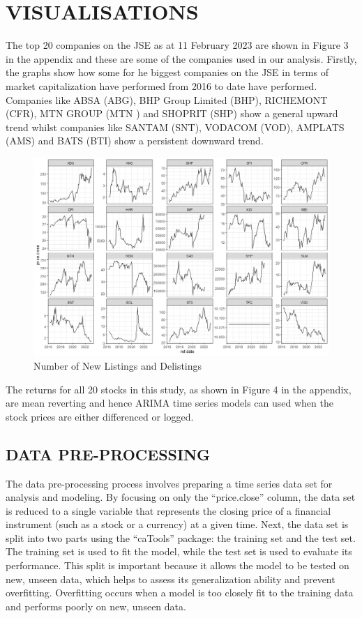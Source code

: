 \documentclass[
]{article}
\begin{document}
\hypertarget{visualisations}{%
\section{VISUALISATIONS}\label{visualisations}}

The top 20 companies on the JSE as at 11 February 2023 are shown in
Figure 3 in the appendix and these are some of the companies used in our
analysis. Firstly, the graphs show how some for he biggest companies on
the JSE in terms of market capitalization have performed from 2016 to
date have performed. Companies like ABSA (ABG), BHP Group Limited (BHP),
RICHEMONT (CFR), MTN GROUP (MTN ) and SHOPRIT (SHP) show a general
upward trend whilst companies like SANTAM (SNT), VODACOM (VOD), AMPLATS
(AMS) and BATS (BTI) show a persistent downward trend.

\begin{figure}
\centering
\includegraphics{prices.png}
\caption{Number of New Listings and Delistings}
\end{figure}

The returns for all 20 stocks in this study, as shown in Figure 4 in the
appendix, are mean reverting and hence ARIMA time series models can used
when the stock prices are either differenced or logged.

\hypertarget{data-pre-processing}{%
\subsection{DATA PRE-PROCESSING}\label{data-pre-processing}}

The data pre-processing process involves preparing a time series data
set for analysis and modeling. By focusing on only the ``price.close''
column, the data set is reduced to a single variable that represents the
closing price of a financial instrument (such as a stock or a currency)
at a given time. Next, the data set is split into two parts using the
``caTools'' package: the training set and the test set. The training set
is used to fit the model, while the test set is used to evaluate its
performance. This split is important because it allows the model to be
tested on new, unseen data, which helps to assess its generalization
ability and prevent overfitting. Overfitting occurs when a model is too
closely fit to the training data and performs poorly on new, unseen
data.
\end{document}
